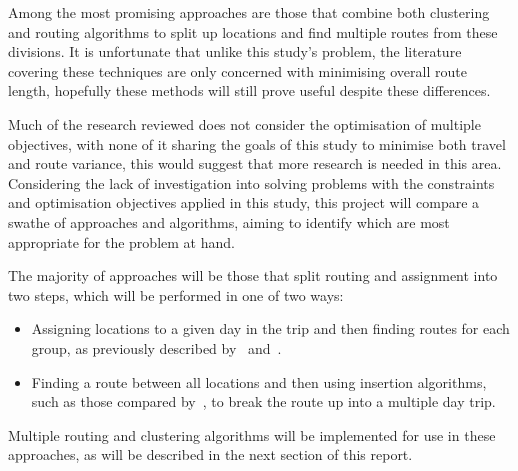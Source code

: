 Among the most promising approaches are those that combine both clustering and routing algorithms to split up locations
and find multiple routes from these divisions.
It is unfortunate that unlike this study's problem, the literature covering these techniques are only concerned with
minimising overall route length, hopefully these methods will still prove useful despite these differences.

Much of the research reviewed does not consider the optimisation of multiple objectives, with none of
it sharing the goals of this study to minimise both travel and route variance, this would suggest that more research is
needed in this area.\\

\noindent
Considering the lack of investigation into solving problems with the constraints and optimisation objectives applied in
this study, this project will compare a swathe of approaches and algorithms, aiming to identify which are most
appropriate for the problem at hand.

The majority of approaches will be those that split routing and assignment into two steps, which will be performed
in one of two ways:
\begin{itemize}
    \item Assigning locations to a given day in the trip and then finding routes for each group, as previously
    described by~\textcite{fisher1981generalized} and~\textcite{nallusamy2010optimization}.
    \item Finding a route between all locations and then using insertion algorithms, such as those compared by~\textcite{vansteenwegen2011orienteering},
    to break the route up into a multiple day trip.
\end{itemize}
\noindent
Multiple routing and clustering algorithms will be implemented for use in these approaches, as will be described in
the next section of this report.